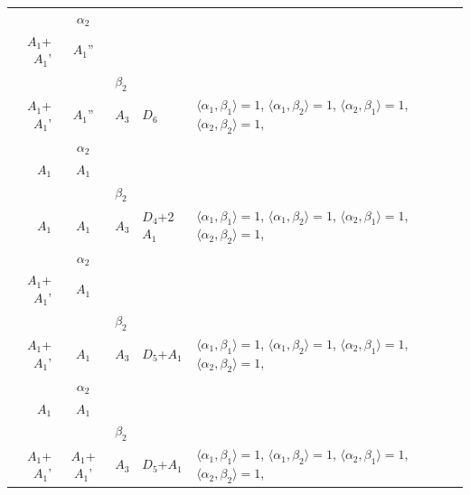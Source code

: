 \documentclass[12pt]{report}
\begin{document}
\begin{appendix}
{\begin{longtable}{rcl p{1cm}p{1cm}p{3cm} }
\begin{tabular}{cc}$\alpha_1$+ & $\alpha_2$\\\tiny{ $A_1$+$A_1$' } & \tiny{ $A_1$'' }\end{tabular} &\begin{tabular}{c} = \\~ \end{tabular} & \begin{tabular}{cc}$\beta_1$+ & $\beta_2$\\\tiny{ $A_1$+$A_1$' } & \tiny{ $A_1$'' }\end{tabular} & $A_3$ & $D_6$ &  $\langle\alpha_1, \beta_1\rangle=1$, $\langle\alpha_1, \beta_2\rangle=1$, $\langle\alpha_2, \beta_1\rangle=1$, $\langle\alpha_2, \beta_2\rangle=1$, 
\\
\begin{tabular}{cc}$\alpha_1$+ & $\alpha_2$\\\tiny{ $A_1$ } & \tiny{ $A_1$ }\end{tabular} &\begin{tabular}{c} = \\~ \end{tabular} & \begin{tabular}{cc}$\beta_1$+ & $\beta_2$\\\tiny{ $A_1$ } & \tiny{ $A_1$ }\end{tabular} & $A_3$ & $D_4$+2$A_1$ &  $\langle\alpha_1, \beta_1\rangle=1$, $\langle\alpha_1, \beta_2\rangle=1$, $\langle\alpha_2, \beta_1\rangle=1$, $\langle\alpha_2, \beta_2\rangle=1$, 
\\
\begin{tabular}{cc}$\alpha_1$+ & $\alpha_2$\\\tiny{ $A_1$+$A_1$' } & \tiny{ $A_1$ }\end{tabular} &\begin{tabular}{c} = \\~ \end{tabular} & \begin{tabular}{cc}$\beta_1$+ & $\beta_2$\\\tiny{ $A_1$+$A_1$' } & \tiny{ $A_1$ }\end{tabular} & $A_3$ & $D_5$+$A_1$ &  $\langle\alpha_1, \beta_1\rangle=1$, $\langle\alpha_1, \beta_2\rangle=1$, $\langle\alpha_2, \beta_1\rangle=1$, $\langle\alpha_2, \beta_2\rangle=1$, 
\\
\begin{tabular}{cc}$\alpha_1$+ & $\alpha_2$\\\tiny{ $A_1$ } & \tiny{ $A_1$ }\end{tabular} &\begin{tabular}{c} = \\~ \end{tabular} & \begin{tabular}{cc}$\beta_1$+ & $\beta_2$\\\tiny{ $A_1$+$A_1$' } & \tiny{ $A_1$+$A_1$' }\end{tabular} & $A_3$ & $D_5$+$A_1$ &  $\langle\alpha_1, \beta_1\rangle=1$, $\langle\alpha_1, \beta_2\rangle=1$, $\langle\alpha_2, \beta_1\rangle=1$, $\langle\alpha_2, \beta_2\rangle=1$, 

\end{longtable}}
\end{appendix}
\end{document}
